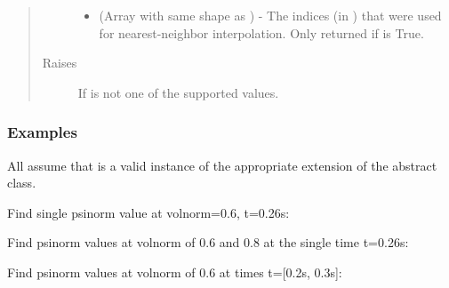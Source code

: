 \documentclass[letterpaper,10pt,english]{sphinxmanual}
\begin{document}
\begin{fulllineitems}
\begin{fulllineitems}
\begin{quote}
\begin{description}
\begin{itemize}
\item {} 
 (Array with same shape as ) - The indices
(in ) that were used for
nearest-neighbor interpolation. Only returned if  is
True.

\end{itemize}


\item[{Raises}] \leavevmode
{} \textendash{} If  is not one of the supported values.

\end{description}\end{quote}
\subsubsection*{Examples}

All assume that  is a valid instance of the appropriate
extension of the {\hyperref[\detokenize{eqtools:eqtools.core.Equilibrium}]{}} abstract class.

Find single psinorm value at volnorm=0.6, t=0.26s:

\begin{sphinxVerbatim}[commandchars=\\\{\}]
    
\end{sphinxVerbatim}

Find psinorm values at volnorm of 0.6 and 0.8 at the
single time t=0.26s:

\begin{sphinxVerbatim}[commandchars=\\\{\}]
   \PYG{p}{[} \PYG{p}{]} 
\end{sphinxVerbatim}

Find psinorm values at volnorm of 0.6 at times t={[}0.2s, 0.3s{]}:

\begin{sphinxVerbatim}[commandchars=\\\{\}]
    \PYG{p}{[} \PYG{p}{]}
\end{sphinxVerbatim}


\end{fulllineitems}
\end{fulllineitems}
\end{document}
